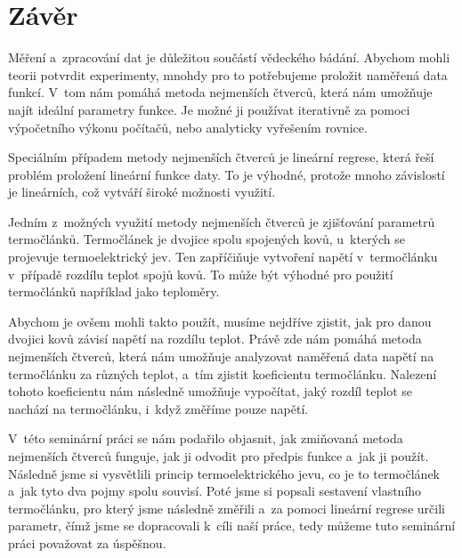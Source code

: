 \section{Závěr}
Měření a~zpracování dat je důležitou součástí vědeckého bádání. Abychom mohli
teorii potvrdit experimenty, mnohdy pro to potřebujeme proložit naměřená data
funkcí. V~tom nám pomáhá metoda nejmenších čtverců, která nám umožňuje najít
ideální parametry funkce. Je možné ji používat iterativně za pomoci výpočetního
výkonu počítačů, nebo analyticky vyřešením rovnice.

Speciálním případem metody nejmenších čtverců je lineární regrese, která řeší
problém proložení lineární funkce daty. To je výhodné, protože mnoho závislostí
je lineárních, což vytváří široké možnosti využití.

Jedním z~možných využití metody nejmenších čtverců je zjišťování parametrů
termočlánků. Termočlánek je dvojice spolu spojených kovů, u~kterých se
projevuje termoelektrický jev. Ten zapříčiňuje vytvoření napětí v~termočlánku
v~případě rozdílu teplot spojů kovů. To může být výhodné pro použití
termočlánků například jako teploměry. 

Abychom je ovšem mohli takto použít, musíme nejdříve zjistit, jak pro danou
dvojici kovů závisí napětí na rozdílu teplot. Právě zde nám pomáhá metoda
nejmenších čtverců, která nám umožňuje analyzovat naměřená data napětí na
termočlánku za různých teplot, a~tím zjistit koeficientu termočlánku.
Nalezení tohoto koeficientu nám následně umožňuje vypočítat, jaký rozdíl teplot
se nachází na termočlánku, i~když změříme pouze napětí.

V~této seminární práci se nám podařilo objasnit, jak zmiňovaná metoda
nejmenších čtverců funguje, jak ji odvodit pro předpis funkce a~jak ji použít.
Následně jsme si vysvětlili princip termoelektrického jevu, co je to
termočlánek a~jak tyto dva pojmy spolu souvisí. Poté jsme si popsali sestavení
vlastního termočlánku, pro který jsme následně změřili a~za pomoci lineární
regrese určili parametr, čímž jsme se dopracovali k~cíli naší práce, tedy
můžeme tuto seminární práci považovat za úspěšnou.
